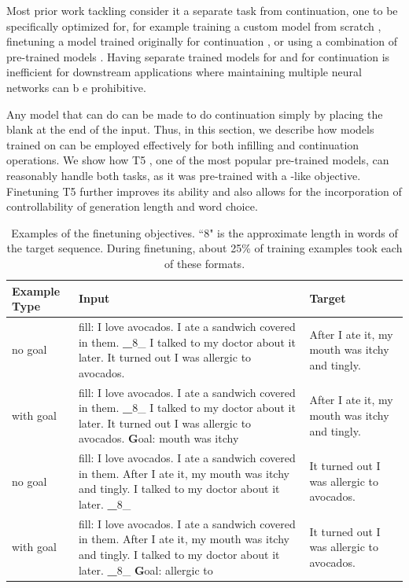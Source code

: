Most prior work tackling \FitB{} consider it a separate task from continuation, one to be specifically optimized for, for example training a custom model from scratch \citep{ippolito2019unsupervised,zhu2019text,mori2020finding}, finetuning a model trained originally for continuation \citep{donahue2020enabling}, or using a combination of pre-trained models \citep{huang2020inset}.
Having separate trained models for \FitB{} and for continuation is inefficient for downstream applications where maintaining multiple neural networks can b e prohibitive.

Any model that can do \FitB{} can be made to do continuation simply by placing the blank at the end of the input.
Thus, in this section, we describe how models trained on \FitB{} can be employed effectively for both infilling and continuation operations.
We show how T5 \citep{raffel2019exploring}, one of the most popular pre-trained models, can reasonably handle both tasks, as it was pre-trained with a \FitB-like objective.
Finetuning T5 further improves its ability and also allows for the incorporation of controllability of generation length and word choice.


\begin{table}[t]
  \centering
  \small
  \caption{Examples of the finetuning objectives. ``8" is the approximate length in words of the target sequence. During finetuning, about 25\% of training examples took each of these formats.}
    \begin{tabular}{p{}p{}p{}}
    \hline
    Example Type & Input & Target \\
    \hline
     \cFITB{} no goal & fill: I love avocados. I ate a sandwich covered in them. {\textbf \_8\_} I talked to my doctor about it later. It turned out I was allergic to avocados. & After I ate it, my mouth was itchy and tingly. \\
    \hline
     \cFITB{}  with goal & fill: I love avocados. I ate a sandwich covered in them.  {\textbf \_8\_} I talked to my doctor about it later. It turned out I was allergic to avocados.  {\textbf Goal: mouth was itchy} & After I ate it, my mouth was itchy and tingly. \\
    \hline
     \cFITB{} no goal& fill: I love avocados. I ate a sandwich covered in them. After I ate it, my mouth was itchy and tingly. I talked to my doctor about it later.  {\textbf \_8\_}  & It turned out I was allergic to avocados. \\
    \hline
     \cFITE{} with goal & fill: I love avocados. I ate a sandwich covered in them. After I ate it, my mouth was itchy and tingly. I talked to my doctor about it later.  {\textbf \_8\_}   {\textbf Goal: allergic to} & It turned out I was allergic to avocados. \\
    \hline
    \end{tabular}
   \vspace{-0.6em}
  \label{tab:task_examples}
  \vspace{-1em}
\end{table}%

